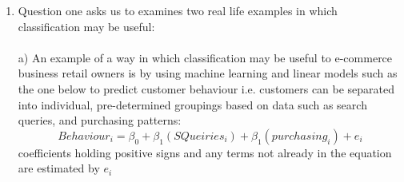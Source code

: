 \documentclass{article}
\begin{document}
\begin{enumerate}
    \item Question one asks us to examines two real life examples in which classification may be useful:\\
    \hspace{1.27cm}\\
    a) An example of a way in which classification may be useful to e-commerce business retail owners is by using machine learning and linear models such as the one below to predict customer behaviour i.e. customers can be separated into individual, pre-determined groupings based on data such as search queries, and purchasing patterns:
    \begin{equation}
    Behaviour_{i} = \beta_{0} + \beta_{1}(SQueiries_{i}) + \beta_1(purchasing_{i}) + e_{i}
    \end{equation}
    coefficients holding positive signs and any terms not already in the equation are estimated by $e_{i}$
    

\end{enumerate}
\end{document}
